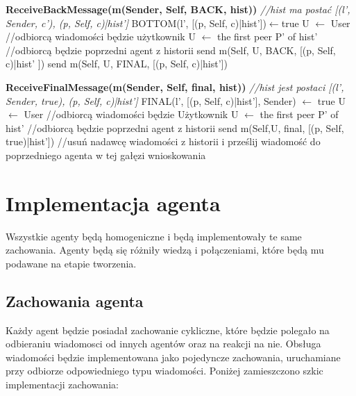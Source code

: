 \documentclass[a4paper,12pt]{mwart}
\begin{document}
\begin{algorithm}[H]
\begin{algorithmic}
\STATE \textbf{ReceiveBackMessage(m(Sender, Self, BACK, hist))}
\STATE \textit{//hist ma postać [(l', Sender, c'), (p, Self, c)|hist']}
\STATE BOTTOM(l', [(p, Self, c)|hist'])$\leftarrow$true
\STATE U $\leftarrow$ User //odbiorcą wiadomości będzie użytkownik
\ELSE
\STATE U $\leftarrow$ the first peer P' of hist' //odbiorcą będzie poprzedni agent z historii
\ENDIF
\STATE send m(Self, U, BACK, [(p, Self, c)|hist' ])
\STATE send m(Self, U, FINAL, [(p, Self, c)|hist'])
\ENDIF
\end{algorithmic}
\end{algorithm}
\begin{algorithm}[H]
\begin{algorithmic}
\STATE \textbf{ReceiveFinalMessage(m(Sender, Self, final, hist))}
\STATE \textit{//hist jest postaci [(l', Sender, true), (p, Self, c)|hist']}
\STATE FINAL(l', [(p, Self, c)|hist'], Sender) $\leftarrow$ true
\STATE U $\leftarrow$ User //odbiorcą wiadomości będzie Użytkownik
\ELSE
\STATE U $\leftarrow$ the first peer P' of hist' //odbiorcą będzie poprzedni agent z historii
\ENDIF
\ENDIF
\STATE send m(Self,U, final, [(p, Self, true)|hist']) //usuń nadawcę wiadomości z historii i prześlij wiadomość do poprzedniego agenta w tej gałęzi wnioskowania
\end{algorithmic}
\end{algorithm}
\section{Implementacja agenta}
Wszystkie agenty będą homogeniczne i będą implementowały te same zachowania. Agenty będą się różniły wiedzą i połączeniami, które będą mu podawane na etapie tworzenia.
\subsection{Zachowania agenta}
Każdy agent będzie posiadał zachowanie cykliczne, które będzie polegało na odbieraniu wiadomosci od innych agentów oraz na reakcji na nie. Obsługa wiadomości będzie implementowana jako pojedyncze zachowania, uruchamiane przy odbiorze odpowiedniego typu wiadomości. Poniżej zamieszczono szkic implementacji zachowania:
\end{document}
